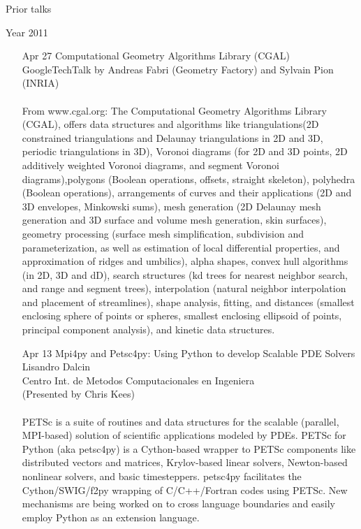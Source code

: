 \documentclass[12]{article}
\begin{document}
\begin{center}
\Large
Prior talks
\end{center}

\begin{center}
\Large
Year 2011
\end{center}

\begin{enumerate}

\item[Apr 27]Computational Geometry Algorithms Library (CGAL)\\GoogleTechTalk by Andreas Fabri (Geometry Factory) and Sylvain Pion (INRIA)\\
\\
From www.cgal.org: The Computational Geometry Algorithms Library (CGAL), offers data structures and algorithms like triangulations(2D constrained triangulations and Delaunay triangulations in 2D and 3D, periodic triangulations in 3D), Voronoi diagrams (for 2D and 3D points, 2D additively weighted Voronoi diagrams, and segment Voronoi diagrams),polygons (Boolean operations, offsets, straight skeleton), polyhedra (Boolean operations), arrangements of curves and their applications (2D and 3D envelopes, Minkowski sums), mesh generation (2D Delaunay mesh generation and 3D surface and volume mesh generation, skin surfaces), geometry processing (surface mesh simplification, subdivision and parameterization, as well as estimation of local differential properties, and approximation of ridges and umbilics), alpha shapes, convex hull algorithms (in 2D, 3D and dD), search structures (kd trees for nearest neighbor search, and range and segment trees), interpolation (natural neighbor interpolation and placement of streamlines), shape analysis, fitting, and distances (smallest enclosing sphere of points or spheres, smallest enclosing ellipsoid of points, principal component analysis), and kinetic data structures.

\item[Apr 13]Mpi4py and Petsc4py: Using Python to develop Scalable PDE Solvers\\Lisandro Dalcin\\Centro Int. de Metodos Computacionales en Ingeniera\\(Presented by Chris Kees)\\
\\
PETSc is a suite of routines and data structures for the
scalable (parallel, MPI-based) solution of scientific applications
modeled by PDEs. PETSc for Python (aka petsc4py)
is a Cython-based wrapper to PETSc components like distributed
vectors and matrices, Krylov-based linear solvers,
Newton-based nonlinear solvers, and basic timesteppers.
petsc4py facilitates the Cython/SWIG/f2py wrapping of
C/C++/Fortran codes using PETSc. New mechanisms are
being worked on to cross language boundaries and easily
employ Python as an extension language.


\end{enumerate}
\end{document}
